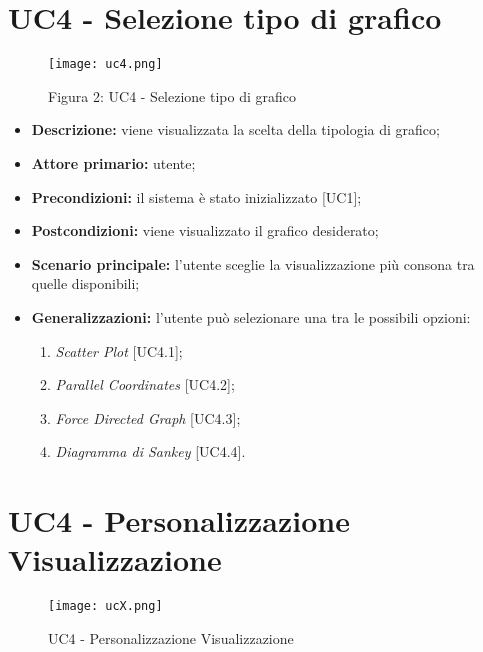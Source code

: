 \section{UC4 - Selezione tipo di grafico}
\begin{figure}[H]
 \texttt{[image: uc4.png]}
 \vspace{-5mm}
 \caption*{Figura 2: UC4 - Selezione tipo di grafico}
\end{figure}

 \begin{itemize}
     \item \textbf{Descrizione:} viene visualizzata la scelta della tipologia di grafico;
     \item \textbf{Attore primario:} utente;
     \item \textbf{Precondizioni:} il sistema è stato inizializzato [UC1];
     \item \textbf{Postcondizioni:} viene visualizzato il grafico desiderato;
     \item \textbf{Scenario principale:} l'utente sceglie la visualizzazione più consona tra quelle disponibili;
     \item \textbf{Generalizzazioni:} l'utente può selezionare una tra le possibili opzioni:
     \begin{enumerate}
         \item \textit{Scatter Plot} [UC4.1];
         \item \textit{Parallel Coordinates} [UC4.2];
         \item \textit{Force Directed Graph} [UC4.3];
         \item \textit{Diagramma di Sankey} [UC4.4].
     \end{enumerate}
 \end{itemize}


\section{UC4 - Personalizzazione Visualizzazione}

\begin{figure}[h]
  \centering
  \texttt{[image: ucX.png]}
  \caption{UC4 - Personalizzazione Visualizzazione}
\end{figure}

